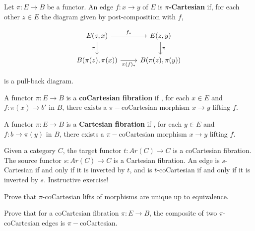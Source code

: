 \begin{definition}
    Let $\pi:E\rightarrow B$ be a functor. An edge $f:x\rightarrow y$ of $E$ is \textbf{$\pi$-Cartesian} if, for each other $z\in E$ the diagram given by post-composition with $f$,

\[\begin{tikzcd}
	{E(z,x)} & {E(z,y)} \\
	{B(\pi(z),\pi(x))} & {B(\pi(z),\pi(y))}
	\arrow["{f_*}", from=1-1, to=1-2]
	\arrow["\pi"', from=1-1, to=2-1]
	\arrow["\pi", from=1-2, to=2-2]
	\arrow["{\pi(f)_*}"', from=2-1, to=2-2]
\end{tikzcd}\]

    is a pull-back diagram.
\end{definition}

\begin{definition}
A functor $\pi: E\rightarrow B$ is a \textbf{coCartesian fibration} if , for each $x\in E$ and $f:\pi(x)\rightarrow b'$ in $B$, there exists a $\pi-$coCartesian morphism $x\rightarrow y$ lifting $f$.

A functor $\pi: E\rightarrow B$ is a \textbf{Cartesian fibration} if , for each $y\in E$ and $f:b\rightarrow \pi(y)$ in $B$, there exists a $\pi-$coCartesian morphism $x\rightarrow y$ lifting $f$.
\end{definition}

\begin{example}
    Given a category $C$, the target functor $t:Ar(C)\rightarrow C$ is a coCartesian fibration. The source functor $s:Ar(C)\rightarrow C$ is a Cartesian fibration. An edge is $s$-Cartesian if and only if it is inverted by $t$, and is $t$-coCartesian if and only if it is inverted by $s.$ Instructive exercise!
\end{example}

\begin{exercise}
    Prove that $\pi$-coCartesian lifts of morphisms are unique up to equivalence.
\end{exercise}

\begin{exercise}
    Prove that for a coCartesian fibration $\pi:E\rightarrow B$, the composite of two $\pi$-coCartesian edges is $\pi-$coCartesian.
\end{exercise}

